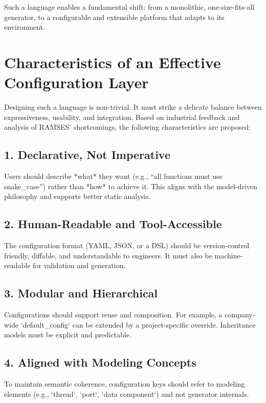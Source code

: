 Such a language enables a fundamental shift: from a monolithic, one-size-fits-all generator, to a configurable and extensible platform that adapts to its environment.

\section{Characteristics of an Effective Configuration Layer}
\label{sec:config_language_characteristics}

Designing such a language is non-trivial. It must strike a delicate balance between expressiveness, usability, and integration. Based on industrial feedback and analysis of RAMSES’ shortcomings, the following characteristics are proposed:

\subsection*{1. Declarative, Not Imperative}

Users should describe *what* they want (e.g., “all functions must use snake\_case”) rather than *how* to achieve it. This aligns with the model-driven philosophy and supports better static analysis.

\subsection*{2. Human-Readable and Tool-Accessible}

The configuration format (YAML, JSON, or a DSL) should be version-control friendly, diffable, and understandable to engineers. It must also be machine-readable for validation and generation.

\subsection*{3. Modular and Hierarchical}

Configurations should support reuse and composition. For example, a company-wide `default\_config` can be extended by a project-specific override. Inheritance models must be explicit and predictable.

\subsection*{4. Aligned with Modeling Concepts}

To maintain semantic coherence, configuration keys should refer to modeling elements (e.g., `thread`, `port`, `data component`) and not generator internals.

